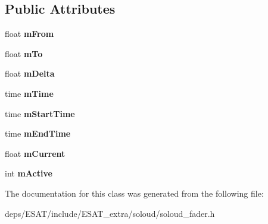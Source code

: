 \subsection*{Public Attributes}
\begin{DoxyCompactItemize}
\item 
\mbox{\label{class_so_loud_1_1_fader_a96a14cb384b0b5a6da2f822aeb771f66}} 
float {\bfseries m\+From}
\item 
\mbox{\label{class_so_loud_1_1_fader_ab83ca38acdf6a04538c041c9c1fd7f13}} 
float {\bfseries m\+To}
\item 
\mbox{\label{class_so_loud_1_1_fader_a99ec0e7cf010c0e3e86998841cfea7e5}} 
float {\bfseries m\+Delta}
\item 
\mbox{\label{class_so_loud_1_1_fader_a6bc8f56f9bd609a34438e427fff7a22f}} 
time {\bfseries m\+Time}
\item 
\mbox{\label{class_so_loud_1_1_fader_a56ce1ecbabe751f09263e56254790f2b}} 
time {\bfseries m\+Start\+Time}
\item 
\mbox{\label{class_so_loud_1_1_fader_a5e0de582ca2a1c8feadad998d6dd58e0}} 
time {\bfseries m\+End\+Time}
\item 
\mbox{\label{class_so_loud_1_1_fader_a6cc1d2a5d4e0f411e1742d4586a663fe}} 
float {\bfseries m\+Current}
\item 
\mbox{\label{class_so_loud_1_1_fader_aebf85d7751bb64982fdc3045798315a4}} 
int {\bfseries m\+Active}
\end{DoxyCompactItemize}


The documentation for this class was generated from the following file\+:\begin{DoxyCompactItemize}
\item 
deps/\+E\+S\+A\+T/include/\+E\+S\+A\+T\+\_\+extra/soloud/soloud\+\_\+fader.\+h\end{DoxyCompactItemize}
